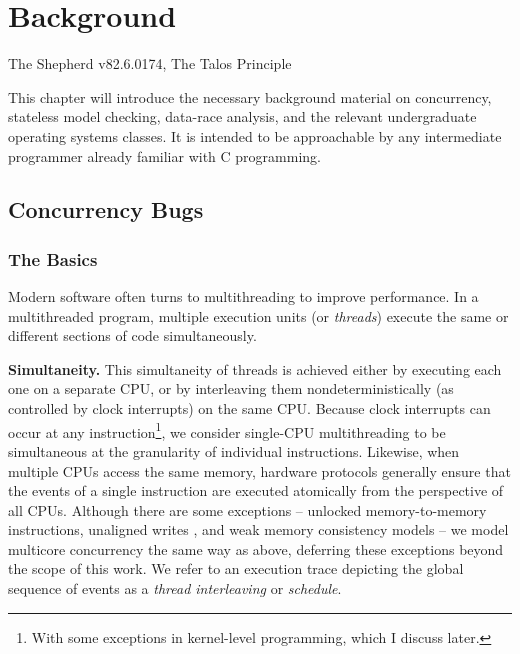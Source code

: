 \chapter{Background}
\label{chap:background}
{The Shepherd v82.6.0174, The Talos Principle}

This chapter will introduce the necessary background material on concurrency, stateless model checking, data-race analysis, and the relevant undergraduate operating systems classes.
It is intended to be approachable by any intermediate programmer
already familiar with C programming.

\section{Concurrency Bugs}

\subsection{The Basics}

Modern software often turns to multithreading to improve performance.
In a multithreaded program, multiple execution units (or {\em threads}) execute the same or different sections of code simultaneously.

{\bf Simultaneity.}
This simultaneity of threads is achieved either by executing each one on a separate CPU, or by interleaving them nondeterministically (as controlled by clock interrupts) on the same CPU.
Because clock interrupts can occur at any instruction\footnote{
	With some exceptions in kernel-level programming, which I discuss later.
},
we consider single-CPU multithreading to be simultaneous at the granularity of individual instructions.
%
Likewise, when multiple CPUs access the same memory,
hardware protocols generally ensure that the events of a single instruction are executed atomically from the perspective of all CPUs.
Although there are some exceptions --
unlocked memory-to-memory instructions,
unaligned writes \cite{unaligned-writes},
and weak memory consistency models \cite{memory-consistency-models} --
we model multicore concurrency the same way as above,
deferring these exceptions beyond the scope of this work.
We refer to an execution trace depicting the global sequence of events as a {\em thread interleaving} or {\em schedule}.


